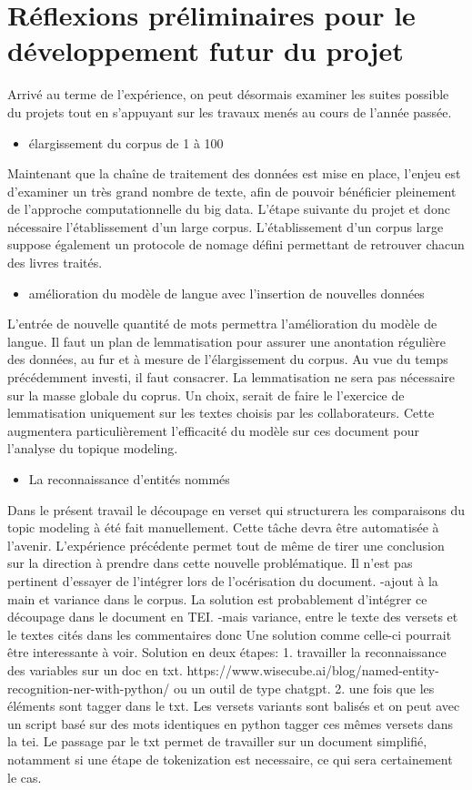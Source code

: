 \documentclass[11pt,french]{article}
\begin{document}
\FloatBarrier
\section{ Réflexions préliminaires pour le développement futur du projet }
Arrivé au terme de l'expérience, on peut désormais examiner les suites possible du projets tout en s'appuyant sur les travaux menés au cours de l'année passée.
\begin{itemize}[label=$\bullet$]
    \item élargissement du corpus de 1 à 100
\end{itemize}
Maintenant que la chaîne de traitement des données est mise en place, l'enjeu est d'examiner un très grand nombre de texte, afin de pouvoir bénéficier pleinement de l'approche computationnelle du big data. L'étape suivante du projet et donc nécessaire l'établissement d'un large corpus. L'établissement d'un corpus large suppose également un protocole de nomage défini permettant de retrouver chacun des livres traités.   
\begin{itemize}[label=$\bullet$]
    \item amélioration du modèle de langue avec l'insertion de nouvelles données
\end{itemize}
L'entrée de nouvelle quantité de mots permettra l'amélioration du modèle de langue. 
Il faut un plan de lemmatisation pour assurer une anontation régulière des données, au fur et à mesure de l'élargissement du corpus. Au vue du temps précédemment investi, il faut consacrer. La lemmatisation ne sera pas nécessaire sur la masse globale du coprus. Un choix, serait de faire le l'exercice de  lemmatisation uniquement sur les textes choisis par les collaborateurs. Cette augmentera particulièrement l'efficacité du modèle sur ces document pour l'analyse du topique modeling.   
\begin{itemize}[label=$\bullet$]
    \item La reconnaissance d'entités nommés
\end{itemize}
Dans le présent travail le découpage en verset qui structurera les comparaisons du topic modeling à été fait manuellement. Cette tâche devra être automatisée à l'avenir. L'expérience précédente permet tout de même de tirer une conclusion sur la direction à prendre dans cette nouvelle problématique. Il n'est pas pertinent d'essayer de l'intégrer lors de l'océrisation du document. -ajout à la main et variance dans le corpus. La solution est probablement d'intégrer ce découpage dans le document en TEI. 
-mais variance, entre le texte des versets et le textes cités dans les commentaires donc 
Une solution comme celle-ci pourrait être interessante à voir.
Solution en deux étapes:
1. travailler la reconnaissance des variables sur un doc en txt. 
https://www.wisecube.ai/blog/named-entity-recognition-ner-with-python/
ou un outil de type chatgpt.
2. une fois que les éléments sont tagger dans le txt. Les versets variants sont balisés et on peut avec un script basé sur des mots identiques en python tagger ces mêmes versets dans la tei. 
Le passage par le txt permet de travailler sur un document simplifié, notamment si une étape de tokenization est necessaire, ce qui sera certainement le cas.
\end{document}
